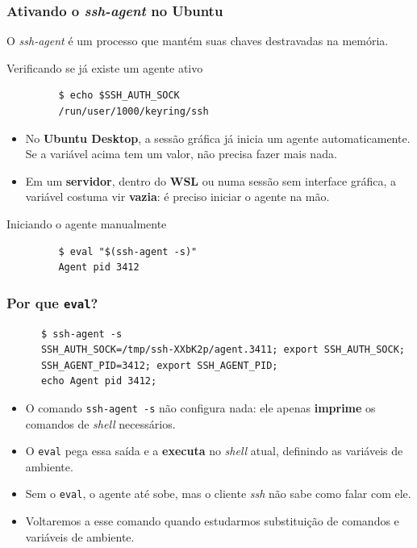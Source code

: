 \documentclass{beamer}
\begin{document}
\begin{frame}[fragile]
   \frametitle{Ativando o \textit{ssh-agent} no Ubuntu}
   O \textit{ssh-agent} é um processo que mantém suas chaves destravadas na memória.
   \begin{block}{Verificando se já existe um agente ativo}
      \begin{verbatim}
         $ echo $SSH_AUTH_SOCK
         /run/user/1000/keyring/ssh
      \end{verbatim}
   \end{block}
   \begin{itemize}
      \item No \textbf{Ubuntu Desktop}, a sessão gráfica já inicia um agente automaticamente. Se a variável acima tem um valor, não precisa fazer mais nada.
      \item Em um \textbf{servidor}, dentro do \textbf{WSL} ou numa sessão sem interface gráfica, a variável costuma vir \textbf{vazia}: é preciso iniciar o agente na mão.
   \end{itemize}
   \begin{block}{Iniciando o agente manualmente}
      \begin{verbatim}
         $ eval "$(ssh-agent -s)"
         Agent pid 3412
      \end{verbatim}
   \end{block}
\end{frame}

\begin{frame}[fragile]
   \frametitle{Por que \texttt{eval}?}
   \begin{verbatim}
      $ ssh-agent -s
      SSH_AUTH_SOCK=/tmp/ssh-XXbK2p/agent.3411; export SSH_AUTH_SOCK;
      SSH_AGENT_PID=3412; export SSH_AGENT_PID;
      echo Agent pid 3412;
   \end{verbatim}
   \begin{itemize}
      \item O comando \texttt{ssh-agent -s} não configura nada: ele apenas \textbf{imprime} os comandos de \textit{shell} necessários.
      \item O \texttt{eval} pega essa saída e a \textbf{executa} no \textit{shell} atual, definindo as variáveis de ambiente.
      \item Sem o \texttt{eval}, o agente até sobe, mas o cliente \textit{ssh} não sabe como falar com ele.
      \item Voltaremos a esse comando quando estudarmos substituição de comandos e variáveis de ambiente.
   \end{itemize}
\end{frame}
\end{document}
